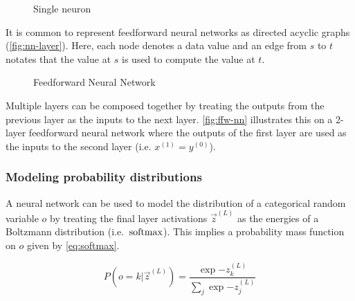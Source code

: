 \begin{figure}[htpb]
    \centering
    
    \caption{Single neuron}
    \label{fig:nn-single}
\end{figure}

It is common to represent feedforward neural networks as directed acyclic
graphs (\autoref{fig:nn-layer}). Here, each node denotes a data value and
an edge from $s$ to $t$ notates that the value at $s$ is used to compute the
value at $t$.

\begin{figure}[htpb]
    \centering
    \caption{Feedforward Neural Network}
    \label{fig:nn-ffw}
\end{figure}

%     

Multiple layers can be composed together by treating the outputs from the previous layer
as the inputs to the next layer. \autoref{fig:ffw-nn} illustrates this on a 2-layer
feedforward neural network where the outputs of the first layer are used as the
inputs to the second layer (i.e. $x^{(1)} = y^{(0)}$).


%     


\subsubsection{Modeling probability distributions}

A neural network can be used to model the distribution of a categorical random
variable $o$ by treating the final layer activations $\vec{z}^{(L)}$ as the
energies of a Boltzmann distribution (i.e.\ $\operatorname*{softmax}$). This implies a
probability mass function on $o$ given by \autoref{eq:softmax}.

\begin{equation}
    \label{eq:softmax}
    P(o = k | \vec{z}^{(L)}) = \frac{\exp{-z^{(L)}_k}}{ \sum_{j} \exp{-z^{(L)}_j} }
\end{equation}

